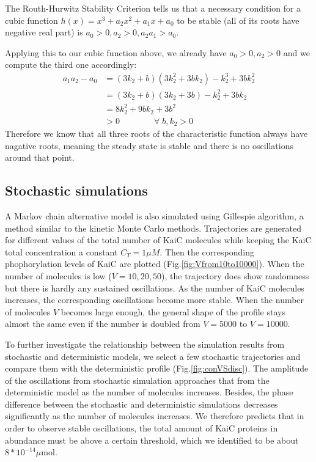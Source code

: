 \documentclass[a4paper,10pt]{article}
\numberwithin{equation}{section}
\begin{document}
The Routh-Hurwitz Stability Criterion tells us that a necessary condition for a cubic function $h(x)=x^3+a_2x^2+a_1x+a_0$ to be stable (all of its roots have negative real part) is $a_0>0, a_2>0, a_2a_1>a_0$.

Applying this to our cubic function above, we already have $a_0>0,a_2>0$ and we compute the third one accordingly:
\begin{equation}
\begin{split}
a_1a_2-a_0&=(3k_2+b)(3k_2^2+3bk_2)-k_2^3+3bk_2^2\\&
=(3k_2+b)(3k_2+3b)-k_2^2+3bk_2\\&
=8k_2^2+9bk_2+3b^2\\
&>0 \qquad \qquad \forall\; b,k_2>0
\end{split}
\end{equation}
Therefore we know that all three roots of the characteristic function always have nagative roots, meaning the steady state is stable and there is no oscillations around that point.


\subsection{Stochastic  simulations}
A Markov chain alternative model is also simulated using Gillespie algorithm, a method similar to the kinetic Monte Carlo methods. Trajectories are generated for different values of the  total number of KaiC molecules while keeping the KaiC total concentration a constant $C_T=1 \mu M$. Then the corresponding phophorylation levels of KaiC are plotted (Fig.\ref{fig:Vfrom10to10000}). When the number of molecules is low ($V=10,20,50$), the trajectory does show randomness but there is hardly any sustained oscillations. As the number of KaiC molecules increases, the corresponding oscillations become more stable. When the number of molecules $V$ becomes large enough, the general shape of the profile stays almost the same even if the number is doubled from $V=5000$ to $V=10000$.

To further investigate the relationship between the simulation results from stochastic and deterministic  models, we select a few stochastic trajectories and compare them with the deterministic profile (Fig.\ref{fig:conVSdisc}). The amplitude of the oscillations from stochastic simulation approaches that from the deterministic model as the number of molecules increases. Besides, the phase difference between the stochastic and deterministic simulations decreases significantly as the number of molecules increases. We therefore predicts that in order to observe stable oscillations, the total amount of KaiC proteins in abundance must be above a certain threshold, which we identified to be about $8*10^{-14} \mu \text{mol}$. 
\end{document}
